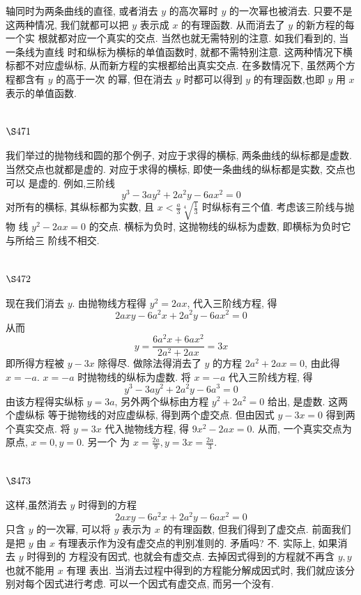 轴同时为两条曲线的直径, 或者消去 $y$ 的高次幂时 $y$ 的一次幂也被消去. 只要不是 这两种情况, 我们就都可以把 $y$ 表示成 $x$ 的有理函数. 从而消去了 $y$ 的新方程的每一个实 根就都对应一个真实的交点. 当然也就无需特别的注意. 如我们看到的, 当一条线为直线 时和纵标为横标的单值函数时, 就都不需特别注意. 这两种情况下横标都不对应虚纵标, 从而新方程的实根都给出真实交点. 在多数情况下, 虽然两个方程都含有 $y$ 的高于一次 的幂, 但在消去 $y$ 时都可以得到 $y$ 的有理函数,也即 $y$ 用 $x$ 表示的单值函数.

\section{$\S 471$}

我们举过的抛物线和圆的那个例子, 对应于求得的横标, 两条曲线的纵标都是虚数. 当然交点也就都是虚的. 对应于求得的横标, 即使一条曲线的纵标都是实数, 交点也可以 是虚的. 例如,三阶线
\[
y^{3}-3 a y^{2}+2 a^{2} y-6 a x^{2}=0
\]
对所有的横标, 其纵标都为实数, 且 $x<\frac{a}{3} \sqrt[4]{\frac{1}{3}}$ 时纵标有三个值. 考虑该三阶线与抛物 线 $y^{2}-2 a x=0$ 的交点. 横标为负时, 这抛物线的纵标为虚数, 即横标为负时它与所给三 阶线不相交.

\section{$\S 472$}

现在我们消去 $y$. 由抛物线方程得 $y^{2}=2 a x$, 代入三阶线方程, 得
\[
2 a x y-6 a^{2} x+2 a^{2} y-6 a x^{2}=0
\]
从而
\[
y=\frac{6 a^{2} x+6 a x^{2}}{2 a^{2}+2 a x}=3 x
\]
即所得方程被 $y-3 x$ 除得尽. 做除法得消去了 $y$ 的方程 $2 a^{2}+2 a x=0$, 由此得 $x=-a$. $x=-a$ 时抛物线的纵标为虚数. 将 $x=-a$ 代入三阶线方程, 得
\[
y^{3}-3 a y^{2}+2 a^{2} y-6 a^{3}=0
\]
由该方程得实纵标 $y=3 a$, 另外两个纵标由方程 $y^{2}+2 a^{2}=0$ 给出, 是虚数. 这两个虚纵标 等于抛物线的对应虚纵标, 得到两个虚交点. 但由因式 $y-3 x=0$ 得到两个真实交点. 将 $y=3 x$ 代入抛物线方程, 得 $9 x^{2}-2 a x=0$. 从而, 一个真实交点为原点, $x=0, y=0$. 另一个 为 $x=\frac{2 a}{9}, y=3 x=\frac{2 a}{3}$.

\section{$\S 473$}

这样,虽然消去 $y$ 时得到的方程
\[
2 a x y-6 a^{2} x+2 a^{2} y-6 a x^{2}=0
\]
只含 $y$ 的一次幂, 可以将 $y$ 表示为 $x$ 的有理函数, 但我们得到了虚交点. 前面我们是把 $y$ 由 $x$ 有理表示作为没有虚交点的判别准则的. 矛盾吗? 不. 实际上, 如果消去 $y$ 时得到的 方程没有因式, 也就会有虚交点. 去掉因式得到的方程就不再含 $y, y$ 也就不能用 $x$ 有理 表出. 当消去过程中得到的方程能分解成因式时, 我们就应该分别对每个因式进行考虑. 可以一个因式有虚交点, 而另一个没有.

